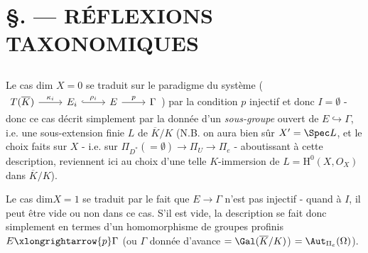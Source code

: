 \chapter*{\S {}. --- RÉFLEXIONS TAXONOMIQUES}\thispagestyle{empty}
\label{sec:8}
\section*{}

Le cas dim $X = 0$ se traduit sur le paradigme du système ($\begin{tikzcd}
	{T(\overline{K})} & {E_i} & E & \Gamma
	\arrow["p", from=1-3, to=1-4]
	\arrow["{\kappa_i}", from=1-1, to=1-2]
	\arrow["{\rho_i}", hook, from=1-2, to=1-3]
\end{tikzcd}$) 
par la condition $p$ injectif et donc $I = \emptyset$ - donc ce cas décrit simplement par la donnée d'un \emph{sous-groupe} ouvert de $E \hookrightarrow \Gamma$, i.e. une sous-extension finie $L$ de $\overline{K}/K$ (N.B. on aura bien sûr $X' = \Spec L$, et le choix faits sur $X$ - i.e. sur $\Pi_{D^*}(= \emptyset) \to \Pi_U \to \Pi_e$ - aboutissant à cette description, reviennent ici au choix d'une telle $K$-immersion de $L = \mathrm{H}^0(X, O_X)$ dans $\overline{K}/K$).

Le cas dim$X = 1$ se traduit par le fait que $E \to \Gamma$ n'est pas injectif - quand à $I$, il peut être vide ou non dans ce cas. S'il est vide, la description se fait donc simplement en termes d'un homomorphisme de groupes profinis $E \xlongrightarrow{p} \Gamma$ (ou $\Gamma$ donnée d'avance $= \Gal(\overline{K}/K)$) $= \Aut_{\Pi_e}(\Omega)$).

